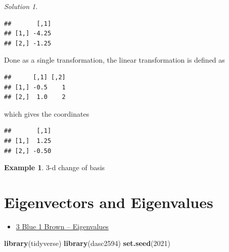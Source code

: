 \documentclass[
]{book}
\newenvironment{Shaded}{\begin{snugshade}}{\end{snugshade}}
\newcommand{\DecValTok}[1]{\textcolor[rgb]{0.00,0.00,0.81}{#1}}
\newcommand{\KeywordTok}[1]{\textcolor[rgb]{0.13,0.29,0.53}{\textbf{#1}}}
\newcommand{\NormalTok}[1]{#1}
\newcommand{\OperatorTok}[1]{\textcolor[rgb]{0.81,0.36,0.00}{\textbf{#1}}}
\newcommand{\StringTok}[1]{\textcolor[rgb]{0.31,0.60,0.02}{#1}}
\providecommand{\tightlist}{%
  \setlength{\itemsep}{0pt}\setlength{\parskip}{0pt}}
\theoremstyle{definition}
\theoremstyle{definition}
\newtheorem{example}{Example}[chapter]
\theoremstyle{definition}
\theoremstyle{definition}
\theoremstyle{remark}
\newtheorem*{solution}{Solution}
\begin{document}
\begin{solution}
\begin{verbatim}
##       [,1]
## [1,] -4.25
## [2,] -1.25
\end{verbatim}

Done as a single transformation, the linear transformation is defined as

\begin{Shaded}
\end{Shaded}

\begin{verbatim}
##      [,1] [,2]
## [1,] -0.5    1
## [2,]  1.0    2
\end{verbatim}

which gives the coordinates

\begin{Shaded}
\end{Shaded}

\begin{verbatim}
##       [,1]
## [1,]  1.25
## [2,] -0.50
\end{verbatim}

\end{solution}

\begin{example}
3-d change of basis
\end{example}

\hypertarget{eigenvectors-and-eigenvalues}{%
\chapter{Eigenvectors and Eigenvalues}\label{eigenvectors-and-eigenvalues}}

\begin{itemize}
\tightlist
\item
  \href{https://www.3blue1brown.com/lessons/eigenvalues}{3 Blue 1 Brown -- Eigenvalues}
\end{itemize}

\begin{Shaded}
\begin{Highlighting}[]
\KeywordTok{library}\NormalTok{(tidyverse)}
\KeywordTok{library}\NormalTok{(dasc2594)}
\KeywordTok{set.seed}\NormalTok{(}\DecValTok{2021}\NormalTok{)}
\end{Highlighting}
\end{Shaded}
\end{document}
